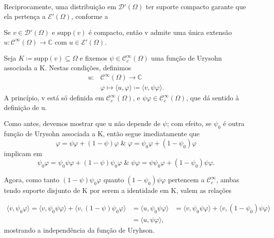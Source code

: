 \documentclass[../distribution_theory_notes.tex]{subfiles}
\begin{document}
Reciprocamente, uma distribuição em \(\mathcal{D}'(\Omega )\) ter suporte compacto garante que ela pertença a \(\mathcal{E}'(\Omega )\), conforme a
\begin{prop*}
	Se \(v\in \mathcal{D}'(\Omega )\) e \(\mathrm{supp}(v)\) é compacto, então v admite uma única extensão \(u:\mathcal{C}^{\infty}(\Omega )\rightarrow \mathbb{C}\) com \(u\in \mathcal{E}'(\Omega )\).
\end{prop*}
\begin{proof*}
	Seja \(K\coloneqq \mathrm{supp}(v)\subseteq \Omega \) e fixemos \(\psi \in \mathcal{C}_{c}^{\infty}(\Omega )\) uma função de Urysohn associada a K. Nestas condições, definimos
	\begin{align*}
		u: & \mathcal{C}^{\infty}(\Omega )\rightarrow \mathbb{C}                                         \\
		   & \varphi \longmapsto \langle u, \varphi  \rangle \coloneqq \langle v, \psi \varphi  \rangle.
	\end{align*}
	A princípio, v está só definida em \(\mathcal{C}_{c}^{\infty}(\Omega )\), e \(\psi \varphi \in \mathcal{C}_{c}^{\infty}(\Omega )\), que dá sentido à definição de u.

	Como antes, devemos mostrar que u não depende de \(\psi \); com efeito, se \(\psi_{0}\) é outra função de Urysohn associada a K, então segue imediatamente que
	\[
		\varphi =\psi \varphi +(1-\psi )\varphi \;\&\; \varphi =\psi_{0}\varphi +(1-\psi_{0})\varphi
	\]
	implicam em
	\[
		\psi_{0}\varphi =\psi_{0}\psi \varphi +(1-\psi )\psi_{0}\varphi \;\&\; \psi \varphi =\psi \psi_{0}\varphi +(1-\psi_{0})\psi \varphi .
	\]

	Agora, como tanto \((1-\psi )\psi_{0}\varphi \) quanto \((1-\psi_{0})\psi \varphi \) pertencem a \(\mathcal{C}_{c}^{\infty}\), ambas tendo suporte disjunto de K por serem a identidade em K, valem as relações

	\begin{align*}
		\langle v, \psi_{0}\varphi  \rangle = \langle v, \psi_{0}\psi \varphi  \rangle + \langle v, (1-\psi )\psi_{0}\varphi  \rangle & = \langle u, \psi_{0}\psi\varphi  \rangle
		                                                                                                                              & = \langle v, \psi_{0}\psi \varphi  \rangle + \langle v, (1-\psi_{0})\psi \varphi  \rangle \\
		                                                                                                                              & = \langle u, \psi \varphi  \rangle,
	\end{align*}
	mostrando a independência da função de Uryhson.


\end{proof*}
\end{document}
